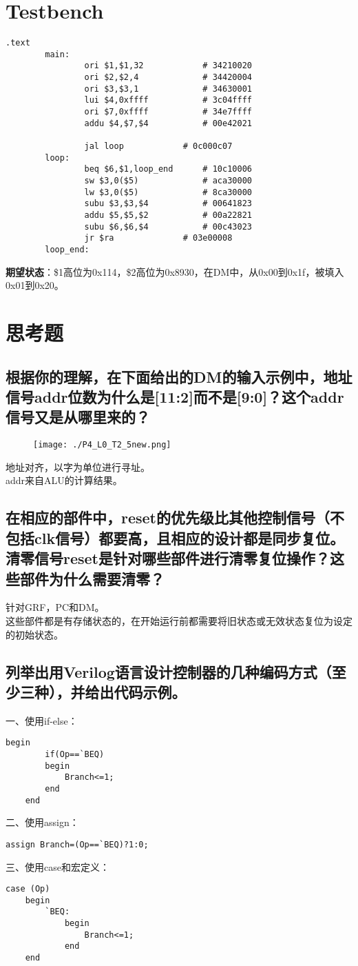 \documentclass[UTF8]{ctexart}
\begin{document}
\section{Testbench}
\begin{center}
	\begin{lstlisting}[style={mips-style}]
				.text
		main:
				ori $1,$1,32 			# 34210020
				ori $2,$2,4 			# 34420004
				ori $3,$3,1 			# 34630001
				lui $4,0xffff			# 3c04ffff
				ori $7,0xffff			# 34e7ffff
				addu $4,$7,$4			# 00e42021
		
				jal loop			# 0c000c07
		loop:
				beq $6,$1,loop_end		# 10c10006
				sw $3,0($5) 			# aca30000
				lw $3,0($5) 			# 8ca30000
				subu $3,$3,$4 			# 00641823
				addu $5,$5,$2 			# 00a22821
				subu $6,$6,$4 			# 00c43023
				jr $ra				# 03e00008
		loop_end:
\end{lstlisting}
\end{center}
\vspace{2ex}
\indent \textbf{期望状态}：\$1高位为0x114，\$2高位为0x8930，在DM中，从0x00到0x1f，被填入0x01到0x20。
\newpage
\section{思考题}
\subsection{根据你的理解，在下面给出的DM的输入示例中，地址信号addr位数为什么是[11:2]而不是[9:0]？这个addr信号又是从哪里来的？}
\begin{figure}[H]
	\centering
	\texttt{[image: ./P4\_L0\_T2\_5new.png]}
\end{figure}
地址对齐，以字为单位进行寻址。\\
\indent addr来自ALU的计算结果。
\subsection{在相应的部件中，reset的优先级比其他控制信号（不包括clk信号）都要高，且相应的设计都是同步复位。清零信号reset是针对哪些部件进行清零复位操作？这些部件为什么需要清零？}
针对GRF，PC和DM。\\
\indent 这些部件都是有存储状态的，在开始运行前都需要将旧状态或无效状态复位为设定的初始状态。
\subsection{列举出用Verilog语言设计控制器的几种编码方式（至少三种），并给出代码示例。}
一、使用if-else：
\begin{lstlisting}[style={verilog-style}]
	begin	
		if(Op==`BEQ)
		begin
			Branch<=1;
		end
	end
\end{lstlisting}
\indent \indent 二、使用assign：
\begin{lstlisting}[style={verilog-style}]
	assign Branch=(Op==`BEQ)?1:0;
\end{lstlisting}
\indent\indent 三、使用case和宏定义：
\begin{lstlisting}[style={verilog-style}]
	case (Op)
	begin
		`BEQ:
			begin
				Branch<=1;
			end
	end
\end{lstlisting}
\end{document}
